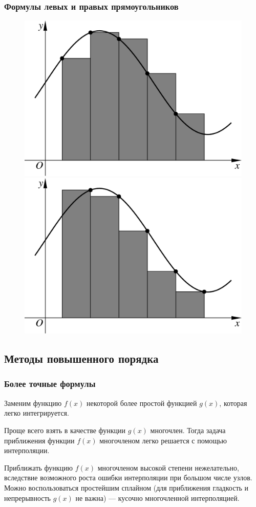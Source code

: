 \documentclass[aspectratio=169,unicode]{beamer}
\begin{document}
\begin{frame}
\frametitle{Формулы левых и правых прямоугольников}
	\begin{figure}%
	\centering
	\includegraphics[width=.65\textheight]{lrect.pdf}%
	\quad
	\includegraphics[width=.65\textheight]{rrect.pdf}%
	\end{figure}
\end{frame}

\subsection{Методы повышенного порядка}
\begin{frame}
\frametitle{Более точные формулы}
	Заменим функцию $f(x)$ некоторой более простой функцией $g(x)$, которая легко
	интегрируется.
	\pause

	Проще всего взять в качестве функции $g(x)$ многочлен. Тогда задача приближения
	функции $f(x)$ многочленом легко решается с помощью интерполяции.
	\pause

	Приближать функцию $f(x)$ многочленом высокой степени нежелательно,
	вследствие возможного роста ошибки интерполяции при большом числе узлов.
	Можно воспользоваться простейшим сплайном (для приближения гладкость и
	непрерывность $g(x)$ не важна) --- кусочно многочленной интерполяцией.
\end{frame}
\end{document}
